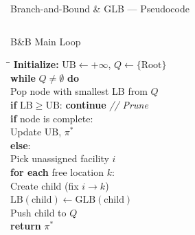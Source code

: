 \documentclass[aspectratio=169,11pt]{beamer}
\begin{document}
\begin{frame}{Branch-and-Bound \& GLB --- Pseudocode}
\vspace{-4pt}
\begin{columns}[T]

\begin{block}{B\&B Main Loop}
\footnotesize
\vspace{-2pt}
\begin{tabbing}
\hspace{3mm}\=\hspace{3mm}\=\hspace{3mm}\=\hspace{3mm}\=\kill
\textbf{Initialize:} $\mathrm{UB}\leftarrow +\infty$,\; $Q\leftarrow\{\text{Root}\}$\\[2pt]
\textbf{while} $Q\neq\emptyset$ \textbf{do}\\
\> Pop node with smallest LB from $Q$\\
\> \textbf{if} $\mathrm{LB}\ge\mathrm{UB}$: \textbf{continue} \hfill\textit{// Prune}\\
\> \textbf{if} node is complete:\\
\>\> Update $\mathrm{UB}$, $\pi^*$\\
\> \textbf{else}:\\
\>\> Pick unassigned facility $i$\\
\>\> \textbf{for each} free location $k$:\\
\>\>\> Create child (fix $i\!\to\!k$)\\
\>\>\> $\mathrm{LB}(\text{child}) \leftarrow \text{GLB}(\text{child})$\\
\>\>\> Push child to $Q$\\[2pt]
\textbf{return} $\pi^*$
\end{tabbing}
\vspace{-4pt}
\end{block}


\end{columns}
\end{frame}
\end{document}
